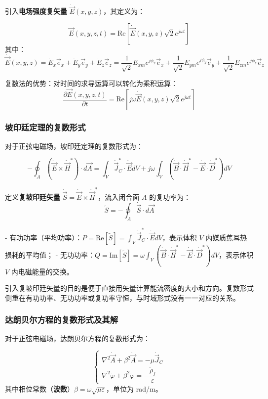 引入\textbf{电场强度复矢量} $\dot{\vec{E}}(x,y,z)$，其定义为：
\begin{formulaBox}
\[
\vec{E}(x,y,z,t) = \text{Re}\left[ \dot{\vec{E}}(x,y,z) \sqrt{2} e^{j\omega t} \right]
\]
其中：
\[
\dot{\vec{E}}(x,y,z) = \dot{E}_x \vec{e}_x + \dot{E}_y \vec{e}_y + \dot{E}_z \vec{e}_z = \frac{1}{\sqrt{2}} E_{xm} e^{j\phi_x} \vec{e}_x + \frac{1}{\sqrt{2}} E_{ym} e^{j\phi_y} \vec{e}_y + \frac{1}{\sqrt{2}} E_{zm} e^{j\phi_z} \vec{e}_z
\]
\end{formulaBox}

复数法的优势：对时间的求导运算可以转化为乘积运算：
\[
\frac{\partial \vec{E}(x,y,z,t)}{\partial t} = \text{Re}\left[ j\omega \dot{\vec{E}}(x,y,z) \sqrt{2} e^{j\omega t} \right]
\]

\subsubsection{坡印廷定理的复数形式}
对于正弦电磁场，坡印廷定理的复数形式为：
\begin{formulaBox}
\[
-\oint_{A} (\dot{\vec{E}} \times \dot{\vec{H}}^*) \cdot d\vec{A} = \int_{V} \dot{\vec{J}}_C^* \cdot \dot{\vec{E}} dV + j\omega \int_{V} (\dot{\vec{B}} \cdot \dot{\vec{H}}^* - \dot{\vec{E}} \cdot \dot{\vec{D}}^*) dV
\]
\end{formulaBox}

定义\textbf{复坡印廷矢量} $\dot{\vec{S}} = \dot{\vec{E}} \times \dot{\vec{H}}^*$，流入闭合面 $A$ 的复功率为：
\[
\widetilde{S} = -\oint_{A} \dot{\vec{S}} \cdot d\vec{A}
\]

- 有功功率（平均功率）：$P = \text{Re}[\widetilde{S}] = \int_{V} \dot{\vec{J}}_C^* \cdot \dot{\vec{E}} dV$，表示体积 $V$ 内媒质焦耳热损耗的平均值；
- 无功功率：$Q = \text{Im}[\widetilde{S}] = \omega \int_{V} (\dot{\vec{B}} \cdot \dot{\vec{H}}^* - \dot{\vec{E}} \cdot \dot{\vec{D}}^*) dV$，表示体积 $V$ 内电磁能量的交换。

引入复坡印廷矢量的目的是便于直接用矢量计算能流密度的大小和方向。复数形式侧重在有功功率、无功功率或复功率守恒，与时域形式没有一一对应的关系。

\subsubsection{达朗贝尔方程的复数形式及其解}
对于正弦电磁场，达朗贝尔方程的复数形式为：
\begin{formulaBox}
\[
\begin{cases}
\nabla^2 \dot{\vec{A}} + \beta^2 \dot{\vec{A}} = -\mu \dot{\vec{J}}_C \\[6pt]
\nabla^2 \dot{\varphi} + \beta^2 \dot{\varphi} = -\dfrac{\dot{\rho}_f}{\varepsilon}
\end{cases}
\]
其中相位常数（\textbf{波数}）$\beta = \omega\sqrt{\mu\varepsilon}$，单位为 rad/m。
\end{formulaBox}


